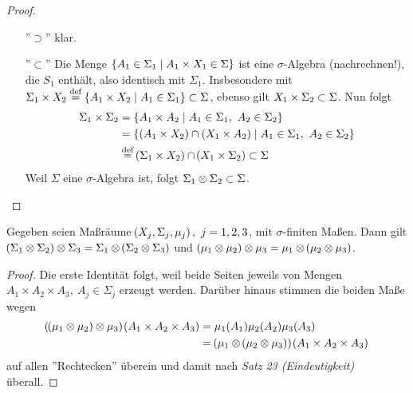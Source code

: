 \documentclass[skript.tex]{subfiles}
\begin{document}
	\begin{proof}
		\hfill
		\begin{itemize}
			\item[''$\supset$''] klar.
			\item[''$\subset$''] Die Menge $\left\{A_1 \in \Sigma_1 \mid A_1 \times X_1 \in \Sigma\right\}$ ist eine $\sigma$-Algebra (nachrechnen!), die $S_1$ enthält, also identisch mit $\Sigma_1$. Insbesondere mit $\Sigma_1 \times X_2 \stackrel{\text{def}}{=} \left\{A_1 \times X_2 \mid A_1 \in \Sigma_1\right\} \subset \Sigma$, ebenso gilt $X_1 \times \Sigma_2 \subset \Sigma$. Nun folgt
			\begin{align*}
				\Sigma_1 \times \Sigma_2 &= \cbr{A_1 \times A_2 \mid A_1 \in \Sigma_1,\ A_2 \in \Sigma_2}\\
				&= \cbr{(A_1\times X_2) \cap (X_1 \times A_2) \mid A_1 \in \Sigma_1,\ A_2 \in \Sigma_2} \\
				&\stackrel{\text{def}}{=} \pr{\Sigma_1 \times X_2} \cap \pr{X_1 \times \Sigma_2} \sbs \Sigma
			\end{align*} 
			Weil $\Sigma$ eine $\sigma$-Algebra ist, folgt $\Sigma_1 \otimes \Sigma_2 \subset \Sigma$.
		\end{itemize}
	\end{proof}
	
	\begin{lem}
		Gegeben seien Maßräume $\pr{X_j, \Sigma_j, \mu_j},\ j=1,2,3$, mit $\sigma$-finiten Maßen. Dann gilt $\pr{\Sigma_1 \otimes \Sigma_2} \otimes \Sigma_3 = \Sigma_1 \otimes \pr{\Sigma_2 \otimes \Sigma_3}$ und $\pr{\mu_1 \otimes \mu_2} \otimes \mu_3 = \mu_1 \otimes \pr{\mu_2 \otimes \mu_3}$.
	\end{lem}

	\begin{proof}
		Die erste Identität folgt, weil beide Seiten jeweils von Mengen $A_1 \times A_2 \times A_3,\ A_j \in \Sigma_j$ erzeugt werden. Darüber hinaus stimmen die beiden Maße wegen
		\begin{align*}
		\pr{\pr{\mu_1 \otimes \mu_2} \otimes \mu_3}\pr{A_1 \times A_2 \times A_3} &= \mu_1(A_1) \mu_2(A_2) \mu_3(A_3)\\
		&= \pr{\mu_1 \otimes \pr{\mu_2 \otimes \mu_3}}\pr{A_1 \times A_2 \times A_3}
		\end{align*}
		auf allen ''Rechtecken'' überein und damit nach \textit{Satz 23 (Eindeutigkeit)} überall.
	\end{proof}
	
\end{document}
